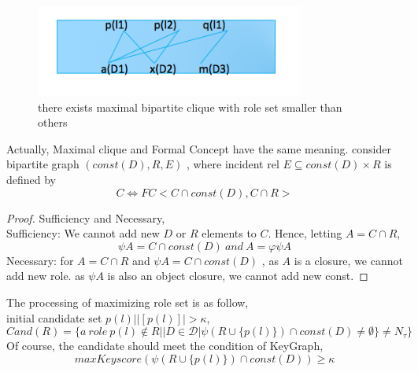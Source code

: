 \begin{figure}[!h]
\centering
\includegraphics[width=250pt]{./pictures/0305-1.png}
\caption{there exists maximal bipartite clique with role set smaller than others}
\end{figure}
\begin{fact}
Actually, Maximal clique and Formal Concept have the same meaning. consider bipartite graph $(const(D),R,E)$ , where incident rel $E\subseteq const(D) \times R$ is defined by
\begin{displaymath}
C \iff FC<C \cap const(D),C\cap R>
\end{displaymath}
\end{fact}
\begin{proof}Sufficiency and Necessary,\\
Sufficiency: We cannot add new $D$ or $R$ elements to $C$. Hence, letting $A = C\cap R$,
\begin{displaymath}
\psi A = C\cap const(D)\ and\ A = \varphi\psi A
\end{displaymath}
Necessary: for $A = C \cap R$ and $\psi A = C \cap const(D)$ , as $A$ is a closure, we cannot add new role. as $\psi A$ is also an object closure, we cannot add new const.
\end{proof}
The processing of maximizing role set is as follow,\\
initial candidate set ${p(l)||[p(l)]| >\kappa}$,
\begin{displaymath}
Cand(R) = \{a\ role\ p(l)\notin R||D\in\mathcal{D}|\psi(R\cup\{p(l)\})\cap const(D)\ne \emptyset \}\ne N_\tau \}
\end{displaymath}
Of course, the candidate should meet the condition of KeyGraph,
\begin{displaymath}
maxKeyscore(\psi(R\cup\{p(l)\})\cap const(D))\geq\kappa
\end{displaymath}